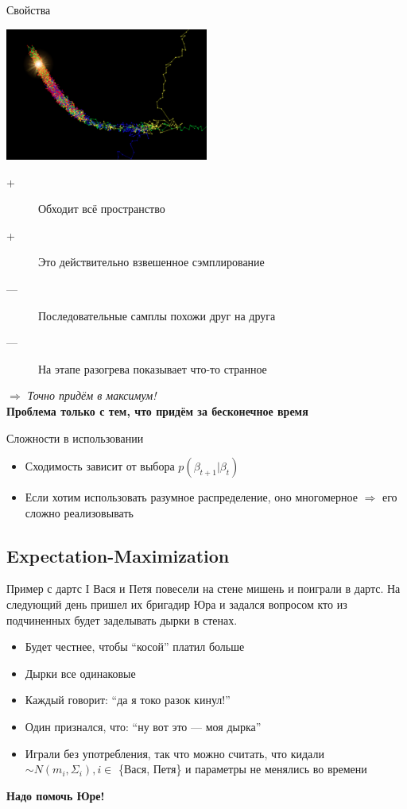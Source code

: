 \documentclass[14pt, fleqn, xcolor={dvipsnames, table}]{beamer}
\begin{document}
\begin{frame}{Свойства}
\begin{center}
\includegraphics[width=0.5\textwidth]{mcmc.png}
\end{center}
\footnotesize
\begin{description}
  \item[\color{green}+] Обходит всё пространство
  \item[\color{green}+] Это действительно взвешенное сэмплирование
  \item[\color{red}---] Последовательные самплы похожи друг на друга
  \item[\color{red}---] На этапе разогрева показывает что-то странное
\end{description}
$\Rightarrow$ \textit{Точно придём в максимум!} \\
\textbf{Проблема только с тем, что придём за бесконечное время}
\end{frame}

\begin{frame}{Сложности в использовании}
\begin{itemize}
  \item Сходимость зависит от выбора $p(\beta_{t+1}|\beta_{t})$
  \item Если хотим использовать разумное распределение, оно многомерное $\Rightarrow$ его сложно реализовывать
\end{itemize}
\end{frame}

\subsection{Expectation-Maximization}
\begin{frame}{Пример с дартс I}
\small
Вася и Петя повесели на стене мишень и поиграли в дартс. На следующий день пришел их бригадир Юра и задался вопросом кто из подчиненных будет заделывать дырки в стенах.
\begin{itemize}
  \item Будет честнее, чтобы ``косой'' платил больше
  \item Дырки все одинаковые
  \item Каждый говорит: ``да я токо разок кинул!''
  \item Один признался, что: ``ну вот это --- моя дырка''
  \item Играли без употребления, так что можно считать, что кидали $\sim N(m_i, \Sigma_i), i \in$ \{Вася, Петя\} и параметры не менялись во времени
\end{itemize}
\textbf{Надо помочь Юре!}
\end{frame}
\end{document}
